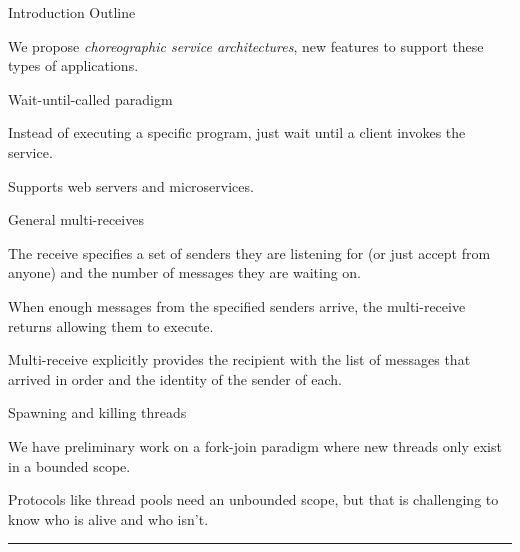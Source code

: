 \begin{outline}{Introduction Outline}
  \item We propose \emph{choreographic service architectures}, new features to support these types of applications.
    \begin{lvl}
      \item Wait-until-called paradigm
        \begin{lvl}
          \item Instead of executing a specific program, just wait until a client invokes the service.
          \item Supports web servers and microservices.
        \end{lvl}

      \item General multi-receives
        \begin{lvl}
          \item The receive specifies a set of senders they are listening for (or just accept from anyone)
            and the number of messages they are waiting on.
          \item When enough messages from the specified senders arrive, the multi-receive returns allowing them to execute.
          \item Multi-receive explicitly provides the recipient with the list of messages that arrived in order and the identity of the sender of each.
        \end{lvl}

      \item Spawning and killing threads
        \begin{lvl}
          \item We have preliminary work on a fork-join paradigm where new threads only exist in a bounded scope.
          \item Protocols like thread pools need an unbounded scope, but that is challenging to know who is alive and who isn't.
        \end{lvl}
    \end{lvl}
\end{outline}
\hrule
\vspace{0.5em}

